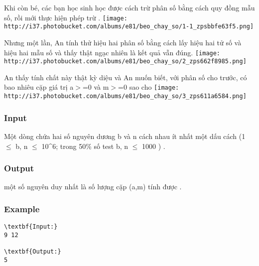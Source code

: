 



    Khi còn bé, các bạn học sinh học được cách trừ phân số bằng cách quy đồng mẫu số, rồi mới thực hiện phép trừ      .   
\texttt{[image: http://i37.photobucket.com/albums/e81/beo\_chay\_so/1-1\_zpsbbfe63f5.png]}

    Nhưng một lần, An tính thử hiệu hai phân số bằng cách lấy hiệu hai tử số và hiệu hai mẫu số và thấy thật ngạc nhiên là kết quả vẫn đúng.    
\texttt{[image: http://i37.photobucket.com/albums/e81/beo\_chay\_so/2\_zps662f8985.png]}

     An thấy tính chất này thật kỳ diệu và An muốn biết, với phân số         cho trước, có bao nhiêu cặp giá trị         a$>$=0 và m$>$=0         sao cho     
\texttt{[image: http://i37.photobucket.com/albums/e81/beo\_chay\_so/3\_zps611a6584.png]}

\subsubsection{   Input  }

    Một dòng chứa hai số nguyên dương b       và n       cách nhau ít nhất một dấu cách (1  $\le$  b, n  $\le$  10\textasciicircum6; trong 50\% số test b, n  $\le$  1000       )      .  

\subsubsection{   Output  }

    một số nguyên duy nhất là số lượng cặp (a,m)       tính được      .  

\subsubsection{   Example  }
\begin{verbatim}
\textbf{Input:}
9 12

\textbf{Output:}
5
\end{verbatim}
